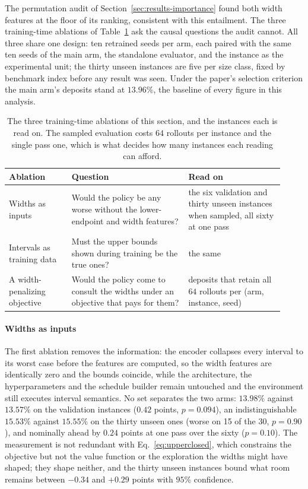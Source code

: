 \documentclass[preprint,authoryear,12pt]{elsarticle}
\theoremstyle{definition}
\theoremstyle{remark}
\begin{document}
The permutation audit of Section~\ref{sec:results-importance} found
both width features at the floor of its ranking, consistent with this
entailment. The three training-time ablations of
Table~\ref{tab:ablations} ask the causal questions the audit cannot.
All three share one design: ten retrained seeds per arm, each paired
with the same ten seeds of the main arm, the standalone evaluator,
and the instance as the experimental unit; the thirty unseen
instances are five per size class, fixed by benchmark index before
any result was seen. Under the paper's selection criterion the main
arm's deposits stand at $13.96\%$, the baseline of every figure in
this analysis.

\begin{table}[t]
\centering\small
\caption{The three training-time ablations of this section, and the
instances each is read on. The sampled evaluation costs $64$ rollouts
per instance and the single pass one, which is what decides how many
instances each reading can afford.}
\label{tab:ablations}
\setlength{\tabcolsep}{4pt}
\renewcommand{\arraystretch}{1.2}
\begin{tabular}{@{}p{0.21\linewidth}p{0.39\linewidth}p{0.32\linewidth}@{}}
\toprule
Ablation & Question & Read on \\
\midrule
Widths as inputs &
Would the policy be any worse without the lower-endpoint and
width features? &
the six validation and thirty unseen instances when sampled, all
sixty at one pass \\
Intervals as training data &
Must the upper bounds shown during training be the true ones? &
the same \\
A width-penalizing objective &
Would the policy come to consult the widths under an objective that
pays for them? &
deposits that retain all $64$ rollouts per (arm, instance, seed) \\
\bottomrule
\end{tabular}
\end{table}

\paragraph{Widths as inputs} The first ablation removes the
information: the encoder collapses every interval to its worst case
before the features are computed, so the width features are
identically zero and the bounds coincide, while the architecture, the
hyperparameters and the schedule builder remain untouched and the
environment still executes interval semantics. No set separates the
two arms: $13.98\%$ against $13.57\%$ on the validation instances
($0.42$ points, $p=0.094$), an indistinguishable $15.53\%$ against
$15.55\%$ on the thirty unseen ones (worse on 15 of the 30,
$p=0.90$), and nominally ahead by $0.24$ points at one pass over the
sixty ($p=0.10$). The measurement is not redundant with
Eq.~\eqref{eq:upperclosed}, which constrains the objective but not
the value function or the exploration the widths might have shaped;
they shape neither, and the thirty unseen instances bound what room
remains between $-0.34$ and $+0.29$ points with $95\%$ confidence.
\end{document}
